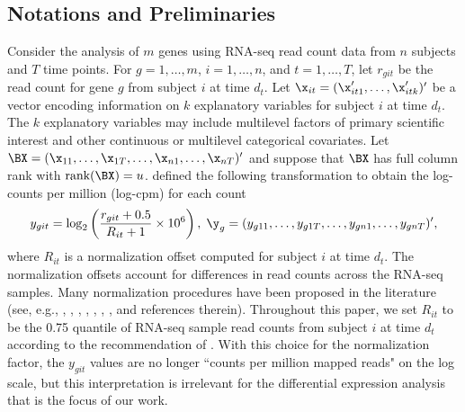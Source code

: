 \subsection{Notations and Preliminaries}
Consider the analysis of $m$ genes using RNA-seq read count data from $n$ subjects and $T$ time points. For $g = 1, \dots, m$, $i = 1, \dots, n$, and $t = 1, \dots, T$, let $r_{git}$ be the read count for gene $g$ from subject $i$ at time  $d_t$. Let $\x_{it} = (\x'_{it1}, \dots, \x'_{itk})'$ be a
vector encoding information on $k$ explanatory variables for subject   $i$  at time  $d_t$. The $k$ explanatory variables may include multilevel factors of primary scientific interest and  other continuous or multilevel categorical covariates. Let $\BX = (\x_{11}, \dots, \x_{1T}, \dots, \x_{n1}, \dots, \x_{nT})'$ and suppose that $\BX$ has full column rank with $\mbox{rank}(\BX) = u$. \citet{law2014} defined the following transformation to obtain the log-counts per million (log-cpm) for each count
\begin{equation}\label{RMlogcpm}
y_{git} = \log_2\left( \frac{r_{git} +0.5}{R_{it} +1} \times 10^6\right), \; \y_g = (y_{g11}, \dots, y_{g1T}, \dots, y_{gn1}, \dots, y_{gnT})',
\end{equation}
where $R_{it}$ is  a normalization offset computed for subject $i$ at time $d_t$. The normalization offsets account for differences in read counts across the RNA-seq samples. Many normalization procedures have been proposed in the literature (see, e.g., \citet{marioni2008}, \citet{mortazavi2008}, \citet{robinson2010}, \citet{anders2010}, \citet{bullard2010}, \citet{risso2014normalization}, \citet{risso2014role}, and references therein). Throughout this paper, we set $R_{it}$ to be the 0.75 quantile of RNA-seq sample read counts from subject $i$ at time $d_t$ according to the recommendation of \citet{bullard2010}. With this choice for the normalization factor, the $y_{git}$ values are no longer ``counts per million mapped reads" on the log scale, but this interpretation is irrelevant for the differential expression analysis that is the focus of our work.

